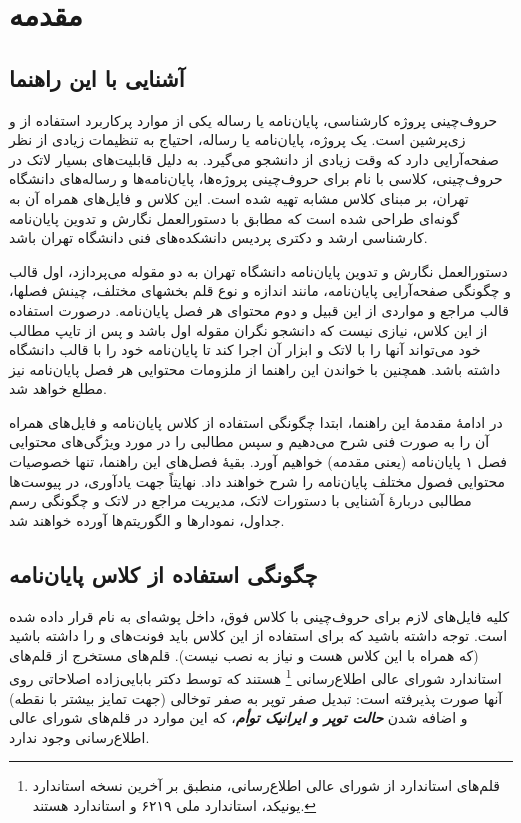 
\chapter{مقدمه}
\section{آشنایی با این راهنما}
حروف‌چینی پروژه کارشناسی، پایان‌نامه یا رساله یکی از موارد پرکاربرد استفاده از
\lr{\LaTeX}
و زی‌پرشین
\cite{Khalighi87xepersian}
است. یک پروژه، پایان‌نامه یا رساله، احتیاج به تنظیمات زیادی از نظر صفحه‌آرایی دارد که وقت زیادی از دانشجو می‌گیرد. به دلیل قابلیت‌های بسیار لاتک در حروف‌چینی، کلاسی با نام 
برای حروف‌چینی پروژه‌ها، پایان‌نامه‌ها و رساله‌های دانشگاه تهران، بر مبنای کلاس مشابه
تهیه شده است. این کلاس و فایل‌های همراه آن به گونه‌ای طراحی شده است که مطابق با دستورالعمل نگارش و تدوین پایان‌نامه کارشناسی ارشد و دکتری پردیس دانشکده‌های فنی دانشگاه تهران
\cite{UTThesisGuide}
باشد.

دستورالعمل نگارش و تدوین پایان‌نامه دانشگاه تهران به دو مقوله می‌پردازد، اول قالب و چگونگی صفحه‌آرایی پایان‌نامه، مانند اندازه و نوع قلم بخشهای مختلف، چینش فصلها، قالب مراجع و مواردی از این قبیل و دوم محتوای هر فصل پایان‌نامه. 
درصورت استفاده از این کلاس، نیازی نیست که دانشجو نگران مقوله اول باشد و پس از تایپ مطالب خود می‌تواند آنها را با لاتک و ابزار آن اجرا کند تا پایان‌نامه خود را با قالب دانشگاه داشته باشد. همچنین با خواندن این راهنما از ملزومات محتوایی هر فصل پایان‌نامه نیز مطلع خواهد شد.

در ادامهٔ  مقدمهٔ این راهنما، ابتدا چگونگی استفاده از کلاس پایان‌نامه و فایل‌های همراه آن را به صورت فنی شرح می‌دهیم و سپس مطالبی را در مورد ویژگی‌های محتوایی فصل ۱ پایان‌نامه (یعنی مقدمه) خواهیم آورد.
بقیهٔ فصل‌های این راهنما، تنها خصوصیات محتوایی فصول مختلف پایان‌نامه را شرح خواهند داد. نهایتاً جهت یادآوری، در پیوست‌ها مطالبی دربارهٔ آشنایی با دستورات لاتک، مدیریت مراجع در لاتک و چگونگی رسم جداول، نمودارها و الگوریتم‌ها آورده خواهند شد.

\section{چگونگی استفاده از کلاس پایان‌نامه}
کلیه فایل‌های لازم برای حروف‌چینی با کلاس فوق، داخل پوشه‌ای به نام
قرار داده شده است. توجه داشته باشید که برای استفاده از این کلاس باید فونت‌های
و
را داشته باشید (که همراه با این کلاس هست و نیاز به نصب نیست).
قلم‌های
مستخرج از قلم‌های استاندارد
شورای عالی اطلاع‌رسانی%
\footnote{
قلم‌های استاندارد
از شورای عالی اطلاع‌رسانی، منطبق بر آخرین نسخه استاندارد یونیکد، استاندارد ملی ۶۲۱۹ و استاندارد
هستند.
}
هستند که توسط دکتر بابایی‌زاده اصلاحاتی روی آنها صورت پذیرفته است: تبدیل صفر توپر به صفر توخالی (جهت تمایز بیشتر با نقطه) و اضافه شدن
\textit{\textbf{حالت توپر و ایرانیک توأم}}،
که این موارد در قلم‌های شورای عالی اطلاع‌رسانی وجود ندارد.

